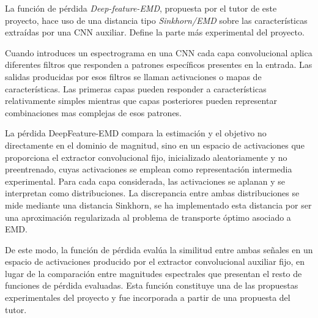 La función de pérdida \textit{Deep-feature-EMD}, propuesta por el tutor de este proyecto, hace uso de una distancia tipo \textit{Sinkhorn/EMD} sobre las características extraídas por una CNN auxiliar. Define la parte más experimental del proyecto.

Cuando introduces un espectrograma en una CNN cada capa convolucional aplica diferentes filtros que responden a patrones específicos presentes en la entrada. Las salidas producidas por esos filtros se llaman activaciones o mapas de características. Las primeras capas pueden responder a características relativamente simples mientras que capas posteriores pueden representar combinaciones mas complejas de esos patrones.

La pérdida DeepFeature-EMD compara la estimación y el objetivo no directamente en el dominio de magnitud, sino en un espacio de activaciones que proporciona el extractor convolucional fijo, inicializado aleatoriamente y no preentrenado, cuyas activaciones se emplean como representación intermedia experimental. Para cada capa considerada, las activaciones se aplanan y se interpretan como distribuciones\cite{sahai2019spectrogram}.
La discrepancia entre ambas distribuciones se mide mediante una distancia Sinkhorn, se ha implementado esta distancia por ser una aproximación regularizada al problema de transporte óptimo asociado a EMD.

De este modo, la función de pérdida evalúa la similitud entre ambas señales en un espacio de activaciones producido por el extractor convolucional auxiliar fijo, en lugar de la comparación entre magnitudes espectrales que presentan el resto de funciones de pérdida evaluadas. Esta función constituye una de las propuestas experimentales del proyecto y fue incorporada a partir de una propuesta del tutor.

